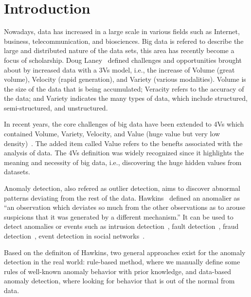\section{Introduction}\label{sec-intro}

Nowadays, 
data has increased in a large scale
in various fields such as Internet,
business, 
telecommunication, 
and biosciences. 
Big data is refered to describe
the large and distributed 
nature of the data sets,
this area has recently become a focus of scholarship.
Doug Laney~\cite{laney01controlling3v} defined challenges 
and opportunities brought about by increased data 
with a 3Vs model, 
i.e., the increase of Volume (great volume), 
Velocity (rapid generation), 
and Variety (various modalities).
Volume is the size of the data that is being accumulated;
Veracity refers to the accuracy of the data; 
and Variety indicates the many types of data,
which include structured,
semi-structured,
and unstructured.

In recent years,
the core challenges of big data 
have been extended to 4Vs which 
contained Volume,
Variety,
Velocity,
and Value (huge value but very low density)~\cite{gantz2011extracting}.
The added item called Value refers to the benefts associated with 
the analysis of data.
The 4Vs definition was widely recognized since
it highlights the meaning and necessity of big data, 
i.e.,
discovering the huge hidden values from datasets.

Anomaly detection,
also refered as outlier detection,
aims to 
discover abnormal patterns 
deviating from the rest of the
data.
Hawkins~\cite{hawkins1980identification} defined an anomalier
as ``an observation which
deviates so much from the other observations
as to arouse suspicions that
it was generated by a different mechanism.''
It can be used to detect anomalies or events such as 
intrusion detection~\cite{garcia2009anomaly}, 
fault detection~\cite{hwang2009survey}, 
fraud detection~\cite{bolton2002statistical},
event detection in social networks~\cite{sakaki2010earthquake}.

Based on the definiton of Hawkins,
two general approaches exist for the anomaly
detection in the real world:
rule-based method,
where we manually define some rules of
well-known anomaly behavior
with prior knowledge,
and data-based anomaly detection,
where looking for behavior that
is out of the normal from data.

